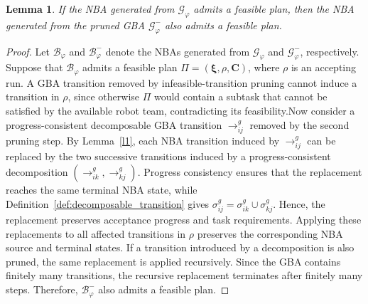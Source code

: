 \documentclass[lettersize,journal]{IEEEtran}
\theoremstyle{italiclemma}
\newtheorem{lemma}{Lemma}
\theoremstyle{italiclemma}
\theoremstyle{definition}
\begin{document}
\begin{lemma}\label{l3}
If the NBA generated from $\mathcal{G}_{\varphi}$ admits a feasible plan, then the NBA generated from the pruned GBA $\mathcal{G}_{\varphi}^{-}$ also admits a feasible plan.
\end{lemma}
\begin{proof}
Let $\mathcal{B}_{\varphi}$ and $\mathcal{B}_{\varphi}^{-}$ denote the NBAs generated from $\mathcal{G}_{\varphi}$ and $\mathcal{G}_{\varphi}^{-}$, respectively. Suppose that
$\mathcal{B}_{\varphi}$ admits a feasible plan
$\Pi=(\boldsymbol{\xi},\rho,\mathbf{C})$, where $\rho$ is an accepting run.  A GBA transition removed by infeasible-transition pruning cannot induce
a transition in $\rho$, since otherwise $\Pi$ would contain a subtask that cannot be satisfied by the available robot team, contradicting its feasibility.Now consider a progress-consistent decomposable GBA transition
$\rightarrow^g_{ij}$ removed by the second pruning step. By
Lemma~\ref{l1}, each NBA transition induced by $\rightarrow^g_{ij}$ can be replaced by the two successive transitions induced by a progress-consistent decomposition
$(\rightarrow^g_{ik},\rightarrow^g_{kj})$. Progress consistency ensures that the replacement reaches the same terminal NBA state, while Definition~\ref{def:decomposable_transition} gives $\sigma^g_{ij}=\sigma^g_{ik}\cup\sigma^g_{kj}$. Hence, the replacement preserves acceptance progress and task requirements. Applying these replacements to all affected transitions in $\rho$ preserves the corresponding NBA source and terminal states. If a transition introduced by a decomposition is also pruned, the same replacement is applied recursively. Since the GBA contains finitely many transitions, the recursive replacement terminates after finitely many steps. Therefore, $\mathcal{B}_{\varphi}^{-}$ also admits a feasible plan.
\end{proof}



\end{document}
